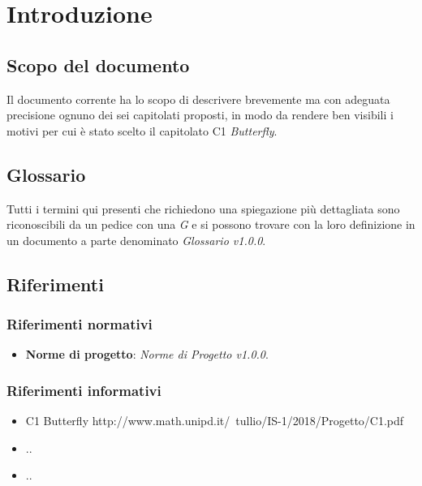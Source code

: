 \section{Introduzione} \label{introduzione}
    \subsection{Scopo del documento}
    Il documento corrente ha lo scopo di descrivere brevemente ma con adeguata precisione ognuno dei sei capitolati proposti, in modo da rendere ben visibili i motivi per cui è stato scelto il capitolato C1 \textit{Butterfly}.

    \subsection{Glossario}
    Tutti i termini qui presenti che richiedono una spiegazione più dettagliata sono riconoscibili da un pedice con una \textit{G} e si possono trovare con la loro definizione in un documento a parte denominato \textit{Glossario v1.0.0}.

    \subsection{Riferimenti}
    	
        \subsubsection{Riferimenti normativi}
	        \begin{itemize}
	        	\item \textbf{Norme di progetto}: \textit{Norme di Progetto v1.0.0}.
	        \end{itemize}

        \subsubsection{Riferimenti informativi}
        	\begin{itemize}
        		\item C1 Butterfly http://www.math.unipd.it/~tullio/IS-1/2018/Progetto/C1.pdf
        		\item ..
        		\item ..
        	\end{itemize}

